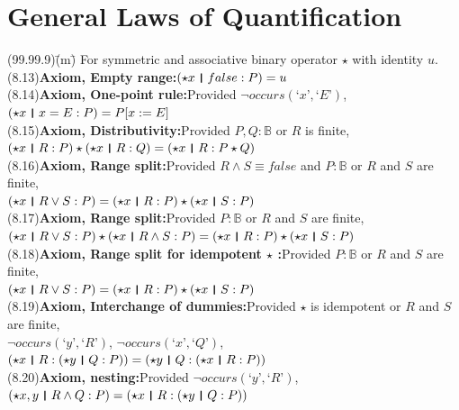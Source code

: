 \documentclass{amsart}
\newcommand{\lgap}{2pt}                             %
\newcommand{\thedr}{\rule[-.25ex]{.32mm}{1.75ex}}   %
\newcommand{\dr}{\;\,\thedr\,\;}                    %
\newcommand{\rb}{:}                                 %
\newcommand{\Lq}{\mbox{`}}
\newcommand{\Rq}{\mbox{'}}
\begin{document}
\section*{General Laws of Quantification}
\begin{tabbing}
(99.99.9)\;\=(m)\;\=\kill
For symmetric and associative binary operator $\star$ with identity $u$.\\[\lgap]
(8.13)\>\textbf{Axiom, Empty range:}\quad $(\star x \dr false \rb P) =u$\\[\lgap]
(8.14)\>\textbf{Axiom, One-point rule:}\quad Provided $\neg occurs(\Lq x\Rq ,\Lq E\Rq)$,\\[\lgap]
      \>$(\star x\dr x=E\rb P) = P[x:=E]$\\[\lgap]
(8.15)\>\textbf{Axiom, Distributivity:}\quad Provided $P,Q:\mathbb{B}$ or $R$ is finite,\\[\lgap]
      \>$(\star x\dr R\rb P)\star (\star x\dr R\rb Q) = (\star x\dr R\rb P\star Q)$\\[\lgap]
(8.16)\>\textbf{Axiom, Range split:}\quad Provided $R\land S\equiv false$ and $P:\mathbb{B}$ or $R$ and $S$ are finite,\\[\lgap]
      \>$(\star x\dr R\lor S\rb P) = (\star x\dr R\rb P)\star (\star x\dr S\rb P)$\\[\lgap]
(8.17)\>\textbf{Axiom, Range split:}\quad Provided $P:\mathbb{B}$ or $R$ and $S$ are finite,\\[\lgap]
      \>$(\star x\dr R\lor S\rb P)\star (\star x\dr R\land S\rb P) = (\star x\dr R\rb P)\star (\star x\dr S\rb P)$\\[\lgap]
(8.18)\>\textbf{Axiom, Range split for idempotent $\star$ :}\quad Provided $P:\mathbb {B}$ or $R$ and $S$ are finite,\\[\lgap]
      \>$(\star x\dr R\lor S\rb P) = (\star x\dr R\rb P)\star (\star x\dr S\rb P)$\\[\lgap]
(8.19)\>\textbf{Axiom, Interchange of dummies:}\quad Provided $\star$ is idempotent or $R$ and $S$ are finite,\\[\lgap]
      \>$\neg occurs(\Lq y\Rq ,\Lq R\Rq)$, $\neg occurs(\Lq x\Rq ,\Lq Q\Rq)$,\\[\lgap]
      \>$(\star x\dr R\rb (\star y\dr Q\rb P)) = (\star y\dr Q\rb (\star x\dr R\rb P))$\\[\lgap]
(8.20)\>\textbf{Axiom, nesting:}\quad Provided $\neg occurs(\Lq y\Rq ,\Lq R\Rq)$,\\[\lgap]
      \>$(\star x,y\dr R\land Q\rb P) = (\star x\dr R\rb (\star y\dr Q\rb P))$\\[\lgap]

\end{tabbing}
\end{document}
